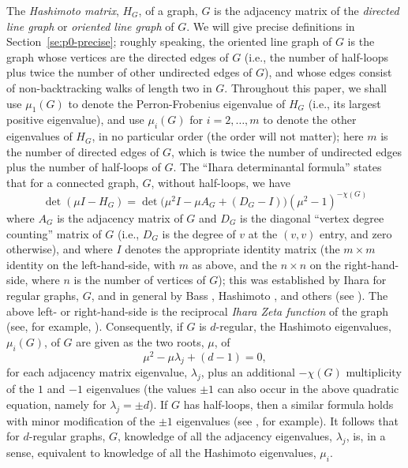 \documentclass{memo-l}
\theoremstyle{plain}
\theoremstyle{definition}
\numberwithin{section}{chapter}
\numberwithin{equation}{chapter}
\theoremstyle{plain}
\theoremstyle{definition}
\begin{document}
The {\em \gls{Hashimoto matrix}}, $H_G$, of a graph, $G$
is the adjacency matrix of the {\em directed
line graph} or {\em oriented line graph} of $G$.  We will give precise
definitions in Section~\ref{se:p0-precise}; roughly speaking, the oriented line
graph of $G$ is the graph whose vertices are the directed edges of $G$
(i.e., the number of half-loops plus
twice the number of other undirected edges of $G$), and whose edges
consist of non-backtracking walks of length two in $G$.
Throughout this paper, we shall use 
$\mu_1(G)$ to denote the
Perron-Frobenius eigenvalue of $H_G$ (i.e., its largest positive 
eigenvalue), and use 
$\mu_i(G)$ for $i=2,\ldots,m$ to denote
the other eigenvalues of $H_G$, in no particular order
(the order will not matter); here $m$ is the number of directed edges
of $G$, which is twice the number of undirected edges plus the
number of half-loops of $G$.
The ``Ihara determinantal formula'' states that for a connected graph,
$G$, without half-loops, we have
\begin{equation}\label{eq:preZeta}
\det(\mu I -H_G) = \det\bigl(\mu^2 I - \mu A_G + (D_G-I) \bigr)
(\mu^2-1)^{-\chi(G)}
\end{equation}
where $A_G$ is the
adjacency matrix of $G$ and $D_G$ is the diagonal ``vertex degree counting''
matrix of $G$ (i.e., $D_G$ is the degree of $v$ at the $(v,v)$ entry,
and zero otherwise), and where $I$ denotes the appropriate identity
matrix (the $m\times m$ identity on the left-hand-side, with $m$ as above,
and the
$n\times n$ on the right-hand-side, where $n$ is the number of vertices
of $G$);
this was established by Ihara \cite{ihara} for regular graphs, $G$,
and in general by Bass \cite{bass_elegant}, Hashimoto \cite{hashimoto_zeta,
hashimoto1,hashimoto2},
and others (see \cite{terras_zeta}).  The above left- or right-hand-side
is the reciprocal 
{\em Ihara Zeta function} of the graph (see, for 
example, \cite{st1,st2,st3,terras_zeta}).
Consequently, if $G$ is $d$-regular, the Hashimoto eigenvalues,
$\mu_i(G)$, of $G$ are given as the two roots, $\mu$, of
$$
\mu^2 - \mu \lambda_j + (d-1) = 0,
$$
for each adjacency matrix eigenvalue, $\lambda_j$, plus an additional
$-\chi(G)$ multiplicity of the $1$ and $-1$ eigenvalues (the values $\pm 1$
can also occur in the above quadratic equation, namely for
$\lambda_j=\pm d$).  If $G$ has
half-loops, then a similar formula holds with minor modification of 
the $\pm 1$ eigenvalues (see \cite{friedman_alon}, for example).
It follows that for $d$-regular graphs, $G$, knowledge of all the
adjacency eigenvalues,
$\lambda_j$, is, in a sense, equivalent to knowledge of all the
Hashimoto eigenvalues, $\mu_i$.
\end{document}
